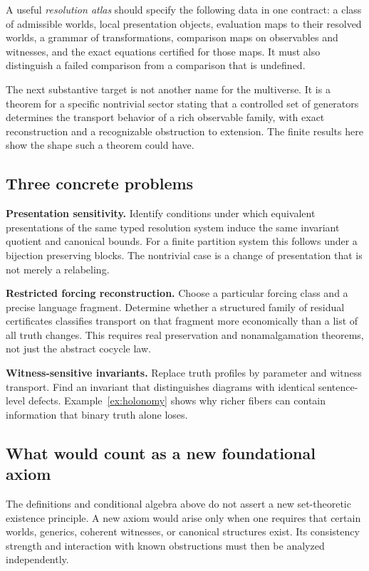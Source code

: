 \documentclass[11pt,letterpaper]{article}
\theoremstyle{definition}
\begin{document}
A useful \emph{resolution atlas} should specify the following data in one contract: a class of admissible worlds, local presentation objects, evaluation maps to their resolved worlds, a grammar of transformations, comparison maps on observables and witnesses, and the exact equations certified for those maps. It must also distinguish a failed comparison from a comparison that is undefined.

The next substantive target is not another name for the multiverse. It is a theorem for a specific nontrivial sector stating that a controlled set of generators determines the transport behavior of a rich observable family, with exact reconstruction and a recognizable obstruction to extension. The finite results here show the shape such a theorem could have.

\subsection{Three concrete problems}
\textbf{Presentation sensitivity.} Identify conditions under which equivalent presentations of the same typed resolution system induce the same invariant quotient and canonical bounds. For a finite partition system this follows under a bijection preserving blocks. The nontrivial case is a change of presentation that is not merely a relabeling.

\textbf{Restricted forcing reconstruction.} Choose a particular forcing class and a precise language fragment. Determine whether a structured family of residual certificates classifies transport on that fragment more economically than a list of all truth changes. This requires real preservation and nonamalgamation theorems, not just the abstract cocycle law.

\textbf{Witness-sensitive invariants.} Replace truth profiles by parameter and witness transport. Find an invariant that distinguishes diagrams with identical sentence-level defects. Example~\ref{ex:holonomy} shows why richer fibers can contain information that binary truth alone loses.

\subsection{What would count as a new foundational axiom}
The definitions and conditional algebra above do not assert a new set-theoretic existence principle. A new axiom would arise only when one requires that certain worlds, generics, coherent witnesses, or canonical structures exist. Its consistency strength and interaction with known obstructions must then be analyzed independently.
\end{document}
